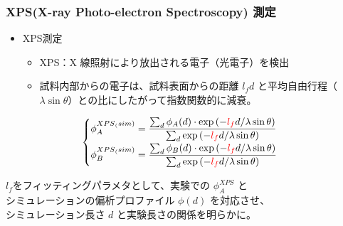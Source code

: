 \documentclass[12pt, dvipdfmx]{beamer}
\begin{document}
\begin{frame}\frametitle{XPS(X-ray Photo-electron Spectroscopy) 測定}

\begin{itemize}
	\item XPS測定
	\begin{itemize}
	\item XPS：X 線照射により放出される電子（光電子）を検出
	\item 試料内部からの電子は、試料表面からの距離 \color{red}$l_{f} d$\color{black} と平均自由行程（\color{red}$\lambda \sin \theta$\color{black}）との比にしたがって\color{red}指数関数的に減衰\color{black}。
	\end{itemize}
\end{itemize}
\begin{equation*}
\begin{cases}
	\phi_A^{{XPS}_(sim)} = 
		\dfrac{\sum_{d} \phi_A(d) \cdot \exp \left(- \color{red}l_{f}\color{black}d/\lambda \sin \theta \right) } 
		{\sum_{d} \exp \left(- \color{red}l_{f}\color{black}d/\lambda \sin \theta \right)} \\[8pt]
	\phi_B^{{XPS}_(sim)} = 
		\dfrac{\sum_{d} \phi_B(d) \cdot \exp \left(- \color{red}l_{f}\color{black}d/\lambda \sin \theta \right) } 
		{\sum_{d} \exp \left(- \color{red}l_{f}\color{black}d/\lambda \sin \theta \right)}
\end{cases}
\end{equation*}


\begin{block}{}
\color{red}$l_f$\color{black}をフィッティングパラメタとして、実験での \color{red}$\phi_A^{XPS}$\color{black} と\\
シミュレーションの偏析プロファイル\color{red} $\phi(d)$ を対応\color{black}させ、\\
シミュレーション長さ\color{red} $d$ と実験長さの関係\color{black}を明らかに。
\end{block}
\end{frame}
\end{document}
